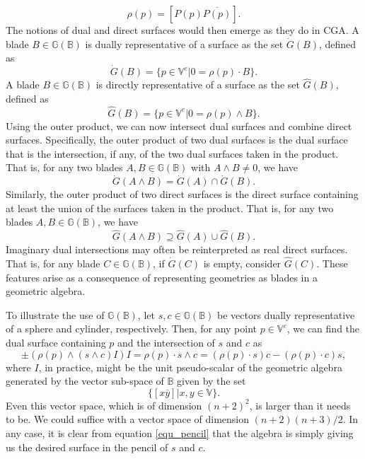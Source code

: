 \documentclass{birkjour}
\theoremstyle{definition}
\theoremstyle{remark}
\numberwithin{equation}{section}
\newcommand{\G}{\mathbb{G}}
\newcommand{\V}{\mathbb{V}}
\newcommand{\B}{\mathbb{B}}
\newcommand{\Gi}{\dot{G}}
\newcommand{\Go}{\hat{G}}
\begin{document}
\begin{equation}\label{equ_def_of_rho}
\rho(p) = [P(p)\overline{P(p)}].
\end{equation}
The notions of dual and direct surfaces
would then emerge as they do in CGA.  A blade $B\in\G(\B)$ is dually representative
of a surface as the set $\Gi(B)$, defined as
\begin{equation}
\Gi(B) = \{p\in\V^e|0=\rho(p)\cdot B\}.
\end{equation}
A blade $B\in\G(\B)$ is directly representative of a surface as the set $\Go(B)$,
defined as
\begin{equation}
\Go(B) = \{p\in\V^e|0=\rho(p)\wedge B\}.
\end{equation}
Using the outer product, we can now
intersect dual surfaces and combine direct surfaces.  Specifically, the outer product
of two dual surfaces is the dual surface that is the intersection, if any, of the two
dual surfaces taken in the product.  That is, for any two blades $A,B\in\G(\B)$
with $A\wedge B\neq 0$, we have
\begin{equation}
\Gi(A\wedge B)=\Gi(A)\cap\Gi(B).
\end{equation}
Similarly, the outer product
of two direct surfaces is the direct surface containing at least the union of the surfaces
taken in the product.  That is, for any two blades $A,B\in\G(\B)$, we have
\begin{equation}
\Go(A\wedge B)\supseteq\Go(A)\cup\Go(B).
\end{equation}
Imaginary dual intersections may often be reinterpreted as real direct surfaces.  That is,
for any blade $C\in\G(\B)$, if $\Gi(C)$ is empty, consider $\Go(C)$.
These features arise as a consequence of representing geometries
as blades in a geometric algebra.

To illustrate the use of $\G(\B)$, let $s,c\in\G(\B)$ be vectors dually representative
of a sphere and cylinder, respectively.  Then, for any point $p\in\V^e$, we can find
the dual surface containing $p$ and the intersection of $s$ and $c$ as
\begin{equation}\label{equ_pencil}
\pm (\rho(p)\wedge(s\wedge c)I)I = \rho(p)\cdot s\wedge c =
(\rho(p)\cdot s)c - (\rho(p)\cdot c)s,
\end{equation}
where $I$, in practice, might be the unit pseudo-scalar of the geometric algebra
generated by the vector sub-space of $\B$ given by the set
\begin{equation}
\{[x\overline{y}]|x,y\in\V\}.
\end{equation}
Even this vector space, which is of dimension $(n+2)^2$, is larger than it needs to be.
We could suffice with a vector space of dimension $(n+2)(n+3)/2$.
In any case, it is clear from equation \eqref{equ_pencil} that the algebra
is simply giving us the desired surface in the pencil of $s$ and $c$.
\end{document}
